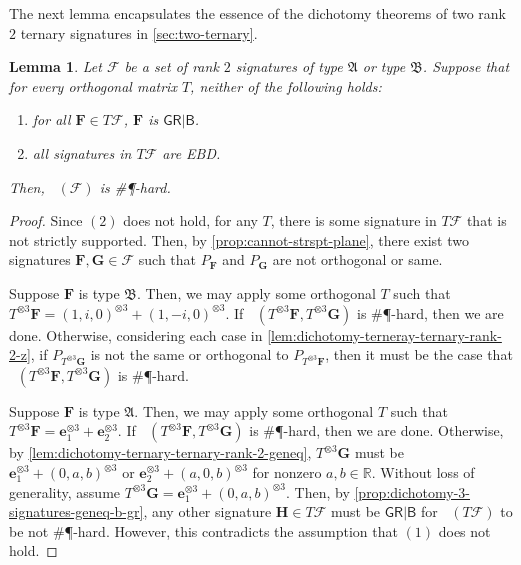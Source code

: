 \documentclass[11pt]{article}
\newtheorem{lemma}[theorem]{Lemma}
\DeclareMathOperator{\holts}{Holant^*_3}
\newcommand{\db}{\mathsf{B}}
\newcommand{\dg}{\mathsf{G}}
\newcommand{\dr}{\mathsf{R}}
\newcommand{\sph}{\#\P-hard\xspace}
\newcommand{\teh}{^{\otimes 3}}
\newcommand{\strspt}{\textsf{EBD}\xspace}
\newcommand{\bdgr}{\dg \dr | \db}
\newcommand{\ternarytractgeneq}{$\mathfrak{A}$\xspace}
\newcommand{\ternarytractz}{$\mathfrak{B}$\xspace}
\begin{document}
The next lemma encapsulates the essence of the dichotomy theorems of two rank $2$ ternary signatures in \cref{sec:two-ternary}.
\begin{lemma}\label{lem:set-of-ternary-signatures-must-bg-r-or-separate}
  Let $\mathcal{F}$ be a set of rank $2$ signatures of type \ternarytractgeneq or type \ternarytractz.
  Suppose that for every orthogonal matrix $T$, neither of the following holds:
  \begin{enumerate}
    \item for all $\mathbf{F} \in T \mathcal{F}$, $\mathbf{F}$ is $\bdgr$.
    \item all signatures in $T \mathcal{F}$ are \strspt.
  \end{enumerate}
  Then, $\holts(\mathcal{F})$ is \sph.
\end{lemma}
\begin{proof}
  Since $(2)$ does not hold, for any $T$, there is some signature in $T \mathcal{F}$ that is not strictly supported. 
  Then, by \cref{prop:cannot-strspt-plane}, there exist two signatures $\mathbf{F}, \mathbf{G} \in \mathcal{F}$ such that $P_{\mathbf{F}}$ and $P_{\mathbf{G}}$ are not orthogonal or same.

  Suppose $\mathbf{F}$ is type \ternarytractz.
  Then, we may apply some orthogonal $T$ such that $T\teh \mathbf{F} = (1, i, 0)\teh + (1, -i, 0)\teh$.
  If $\holts(T \teh \mathbf{F}, T \teh \mathbf{G})$ is \sph, then we are done.
  Otherwise,
  considering each case in \cref{lem:dichotomy-terneray-ternary-rank-2-z}, if $P_{T \teh \mathbf{G}}$ is not the same or orthogonal to $P_{T \teh \mathbf{F}}$, then it must be the case that $\holts(T \teh \mathbf{F}, T \teh \mathbf{G})$ is \sph.

  Suppose $\mathbf{F}$ is type \ternarytractgeneq.
  Then, we may apply some orthogonal $T$ such that $T \teh \mathbf{F} = \mathbf{e}_1\teh + \mathbf{e}_2\teh$.
  If $\holts(T \teh \mathbf{F}, T \teh \mathbf{G})$ is \sph, then we are done.
  Otherwise,
  by \cref{lem:dichotomy-ternary-ternary-rank-2-geneq}, 
  $T\teh \mathbf{G}$ must be $\mathbf{e}_1\teh + (0, a, b)\teh$ or $\mathbf{e}_2\teh + (a, 0, b)\teh$
  for nonzero $a, b \in \mathbb{R}$.
  Without loss of generality, assume $T \teh \mathbf{G} = \mathbf{e}_1\teh + (0, a, b)\teh$.
  Then, by \cref{prop:dichotomy-3-signatures-geneq-b-gr}, any other signature $\mathbf{H} \in T\mathcal{F}$ must be $\bdgr$ for $\holts(T \mathcal{F})$ to be not \sph.
  However, this contradicts the assumption that $(1)$ does not hold.
\end{proof}
\end{document}
